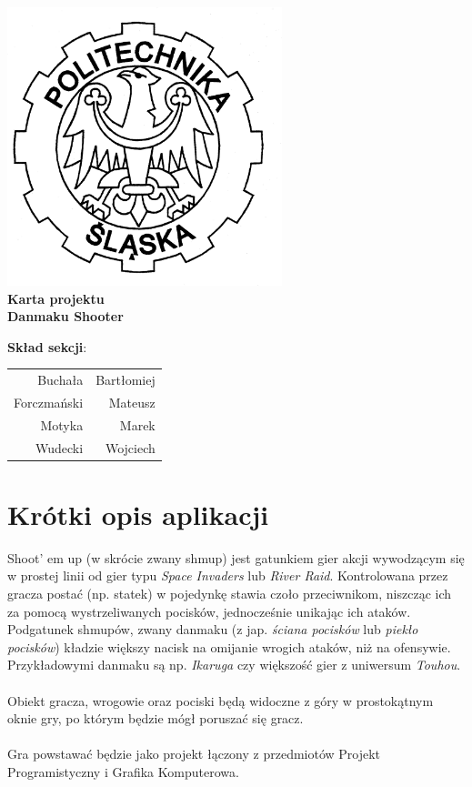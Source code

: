 \documentclass[a4paper,twoside]{article}
\begin{document}
\begin{titlepage}
	\centering
	\includegraphics[width=0.6\textwidth]{./images/logo.png}
	\\\vspace{10mm}
	\textbf{{\huge Karta projektu}}\\\vspace{5mm}
	\textbf{{\Huge Danmaku Shooter}}
	\\
	\vfill
	\begin{flushright}
			{\Large \textbf{Skład sekcji}:}\\
		\begin{tabular}{rr}
			{\Large Buchała} & {\Large Bartłomiej}\\[-3pt]
			{\Large Forczmański} & {\Large Mateusz}\\[-3pt]
			{\Large Motyka} & {\Large Marek}\\[-3pt]
			{\Large Wudecki} & {\Large Wojciech}
		\end{tabular}
	\end{flushright}
	
\end{titlepage}



\part{\huge \textbf{Krótki opis aplikacji}}
Shoot' em up (w skrócie zwany shmup) jest gatunkiem gier akcji wywodzącym się w prostej linii od gier typu \textit{Space Invaders} lub \textit{River Raid}. Kontrolowana przez gracza postać (np. statek) w pojedynkę stawia czoło przeciwnikom, niszcząc ich za pomocą wystrzeliwanych pocisków, jednocześnie unikając ich ataków. Podgatunek shmupów, zwany danmaku (z jap. \textit{ściana pocisków} lub \textit{piekło pocisków}) kładzie większy nacisk na omijanie wrogich ataków, niż na ofensywie. Przykładowymi danmaku są np. \textit{Ikaruga} czy większość gier z uniwersum \textit{Touhou}. \\\\
Obiekt gracza, wrogowie oraz pociski będą widoczne z góry w prostokątnym oknie gry, po którym będzie mógł poruszać się gracz.\\\\
Gra powstawać będzie jako projekt łączony z przedmiotów Projekt Programistyczny i Grafika Komputerowa.
\end{document}
